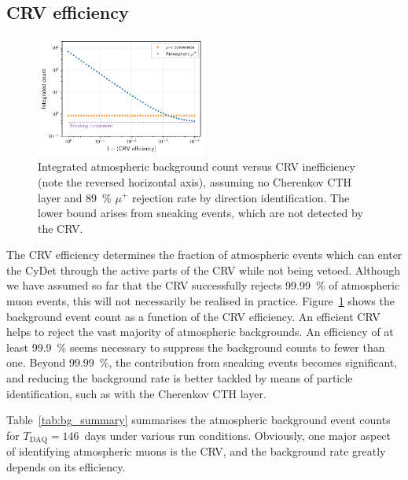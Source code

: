 \subsection{CRV efficiency}

\begin{figure}
    \centering
    \includegraphics[width=0.5\textwidth]{chapter6/bg_count_vs_crv_efficiency.pdf}
    \caption[Integrated atmospheric background count versus CRV inefficiency]{ Integrated atmospheric background count versus CRV inefficiency
        (note the reversed horizontal axis), assuming no Cherenkov CTH layer and
        \SI{89}{\percent} $\mu^+$ rejection rate by direction identification.
        The lower bound arises from sneaking events, which are not detected by
        the CRV. 
        }
    \label{fig:bg_count_vs_crv_efficiency}
\end{figure}

The CRV efficiency determines the fraction of atmospheric events which can enter
the CyDet through the active parts of the CRV while not being vetoed. Although
we have assumed so far that the CRV successfully rejects \SI{99.99}{\percent} of
atmospheric muon events, this will not necessarily be realised in practice.
Figure~\ref{fig:bg_count_vs_crv_efficiency} shows the background event count as
a function of the CRV efficiency. An efficient CRV helps to reject the vast
majority of atmospheric backgrounds. An efficiency of at least
\SI{99.9}{\percent} seems necessary to suppress the background counts to fewer
than one. Beyond \SI{99.99}{\percent}, the contribution from sneaking events
becomes significant, and reducing the background rate is better tackled by means
of particle identification, such as with the Cherenkov CTH layer.

Table~\ref{tab:bg_summary} summarises the atmospheric background event counts
for $T_\mathrm{DAQ}=146$~days under various run conditions. Obviously, one major
aspect of identifying atmospheric muons is the CRV, and the background rate
greatly depends on its efficiency.

